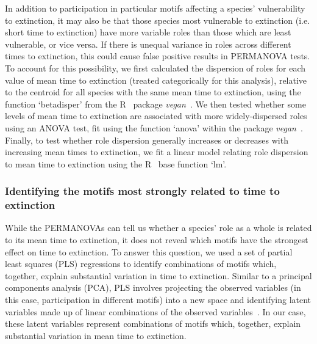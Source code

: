 \documentclass[12pt]{article}
\begin{document}
            
            In addition to participation in particular motifs affecting a species' vulnerability to extinction, it may also be that those species most vulnerable to extinction (i.e. short time to extinction) have more variable roles than those which are least vulnerable, or vice versa. 
            If there is unequal variance in roles across different times to extinction, this could cause false positive results in PERMANOVA tests.
            To account for this possibility, we first calculated the dispersion of roles for each value of mean time to extinction (treated categorically for this analysis), relative to the centroid for all species with the same mean time to extinction, using the function `betadisper' from the R~\citep{R} package \emph{vegan}~\citep{vegan}.
            We then tested whether some levels of mean time to extinction are associated with more widely-dispersed roles using an ANOVA test, fit using the function `anova' within the package \emph{vegan}~\citep{vegan}.
            Finally, to test whether role dispersion generally increases or decreases with increasing mean times to extinction, we fit a linear model relating role dispersion to mean time to extinction using the R~\citep{R} base function `lm'.


		\subsubsection*{Identifying the motifs most strongly related to time to extinction}

			While the PERMANOVAs can tell us whether a species' role as a whole is related to its mean time to extinction, it does not reveal which motifs have the strongest effect on time to extinction.
			To answer this question, we used a set of partial least squares (PLS) regressions to identify combinations of motifs which, together, explain substantial variation in time to extinction. 
			Similar to a principal components analysis (PCA), PLS involves projecting the observed variables (in this case, participation in different motifs) into a new space and identifying latent variables made up of linear combinations of the observed variables~\citep{Mevik2004,pls}.
			In our case, these latent variables represent combinations of motifs which, together, explain substantial variation in mean time to extinction.
			
\end{document}
